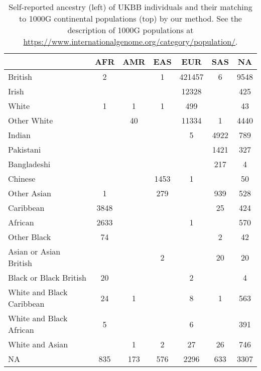 \begin{table}[ht]
\centering
\caption{Self-reported ancestry (left) of UKBB individuals and their matching to 1000G continental populations (top) by our method. See the description of 1000G populations at \url{https://www.internationalgenome.org/category/population/}.} 
\label{tab:infer-UKBB-superpop}
\begin{tabular}{|l|c|c|c|c|c|c|}
  \hline
 & AFR & AMR & EAS & EUR & SAS & NA \\ 
  \hline
British & 2 &  & 1 & 421457 & 6 & 9548 \\ 
  Irish &  &  &  & 12328 &  & 425 \\ 
  White & 1 & 1 & 1 & 499 &  & 43 \\ 
  Other White &  & 40 &  & 11334 & 1 & 4440 \\ 
   \hline
Indian &  &  &  & 5 & 4922 & 789 \\ 
  Pakistani &  &  &  &  & 1421 & 327 \\ 
  Bangladeshi &  &  &  &  & 217 & 4 \\ 
  Chinese &  &  & 1453 & 1 &  & 50 \\ 
  Other Asian & 1 &  & 279 &  & 939 & 528 \\ 
   \hline
Caribbean & 3848 &  &  &  & 25 & 424 \\ 
  African & 2633 &  &  & 1 &  & 570 \\ 
  Other Black & 74 &  &  &  & 2 & 42 \\ 
   \hline
Asian or Asian British &  &  & 2 &  & 20 & 20 \\ 
  Black or Black British & 20 &  &  & 2 &  & 4 \\ 
  White and Black Caribbean & 24 & 1 &  & 8 & 1 & 563 \\ 
  White and Black African & 5 &  &  & 6 &  & 391 \\ 
  White and Asian &  & 1 & 2 & 27 & 26 & 746 \\ 
   \hline
NA  & 835 & 173 & 576 & 2296 & 633 & 3307 \\ 
   \hline
\end{tabular}
\end{table}
